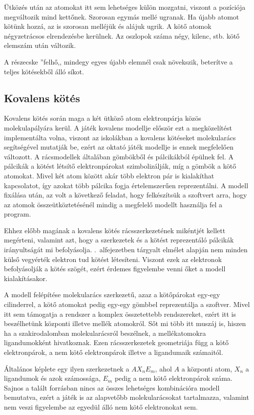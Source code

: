 \documentclass[colorlinks]{thesis-ekf}
\theoremstyle{definition}
\theoremstyle{remark}
\begin{document}
Ütközés után az atomokat itt sem lehetséges külön mozgatni, viszont a pozíciója megváltozik mind kettőnek. Szorosan egymás mellé ugranak. Ha újabb atomot kötünk hozzá, az is szorosan melléjük és alájuk ugrik. A kötő atomok négyzetrácsos elrendezésbe kerülnek. Az oszlopok száma négy, kilenc, stb. kötő elemszám után változik.

A részecske ''felhő,, mindegy egyes újabb elemnél csak növekszik, beterítve a teljes kötésekből álló síkot.
\subsection{Kovalens kötés}
Kovalens kötés során maga a két ütköző atom elektronpárja közös molekulapályára kerül. A játék kovalens modellje először ezt a megközelítést implementálta volna, viszont az iskolákban a kovalens kötéseket molekularács segítségével mutatják be, ezért az oktató játék modellje is ennek megfelelően változott.
A rácsmodellek általában gömbökből és pálcikákból épülnek fel. A pálcikák a kötést létsítő elektronpárokat szimbolizálják, míg a gömbök a kötő atomokat. Mivel két atom között akár több elektron pár is kialakíthat kapcsolatot, így azokat több pálcika fogja értelemszerűen reprezentálni. A modell fixálása után, az volt a következő feladat, hogy felkészítsük a szoftvert arra, hogy az atomok összeütköztetésénél mindig a megfelelő modellt használja fel a program.

Ehhez előbb magának a kovalens kötés rácsszerkezetének mikéntjét kellett megérteni, valamint azt, hogy a szerkezetek és a kötést reprezentáló pálcikák irányultságát mi befolyásolja. .~alfejezetben tárgyalt elmélet alapján nem minden külső vegyérték elektron tud kötést létesíteni. Viszont ezek az elektronok befolyásolják a kötés szögét, ezért érdemes figyelembe venni őket a modell kialakításakor. 

A modell felépítése molekularács szerkezetű, azaz a kötőpárokat egy-egy cilinderrel, a kötő atomokat pedig egy-egy gömbbel reprezentálja a szoftver. Mivel itt sem támogatja a rendszer a komplex összetettebb rendszereket, ezért itt is beszélhetünk központi illetve mellék atomokról. Sőt mi több itt muszáj is, hiszen ha a szakirodalomban molekularácsról beszélnek, a mellékatomokra ligandumokként hivatkoznak. Ezen rácsszerkezetek geometriája függ a kötő elektronpárok, a nem kötő elektronpárok illetve a ligandumaik számaitól. 

Általános képlete egy ilyen szerkezetnek a \begin{math}AX_{n}E_{m}\end{math}, ahol \begin{math}A\end{math} a központi atom, \begin{math}X_{n}\end{math} a ligandumok és azok számossága, \begin{math}E_{m}\end{math} pedig a nem kötő elektronpárok száma. Sajnos a talált forrásban nincs az összes lehetséges kombinációra modell bemutatva, ezért a játék is az alapvetőbb molekularácsokat tartalmazza, valamint nem veszi figyelembe az egyedül álló nem kötő elektronokat sem.\cite{kovalens_modell}
\end{document}
